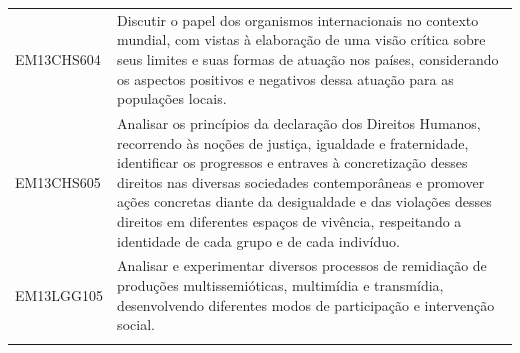 \documentclass[12pt]{extarticle}
\begin{document}
\begin{longtable}{ll}
EM13CHS604 & Discutir o papel dos organismos internacionais no contexto mundial, com vistas à elaboração de uma visão crítica sobre seus limites e suas formas de atuação nos países, considerando os aspectos positivos e negativos dessa atuação para as populações locais.                                                                                                                                                                                                                                                                                                                                                                                                                                                                                                                                                      \\
\rowcolor[HTML]{E0F7FA} 
EM13CHS605 & Analisar os princípios da declaração dos Direitos Humanos, recorrendo às noções de justiça, igualdade e fraternidade, identificar os progressos e entraves à concretização desses direitos nas diversas sociedades contemporâneas e promover ações concretas diante da desigualdade e das violações desses direitos em diferentes espaços de vivência, respeitando a identidade de cada grupo e de cada indivíduo.                                                                                                                                                                                                                                                                                                                                                                                                    \\
\rowcolor[HTML]{FFF} 
EM13LGG105 & Analisar e experimentar diversos processos de remidiação de produções multissemióticas, multimídia e transmídia, desenvolvendo diferentes modos de participação e intervenção social.                                                                                                                                                                                                                                                                                                                                                                                                                                                                                                                                                                                                                                 \\
\rowcolor[HTML]{E0F7FA} 

\end{longtable}
\end{document}
